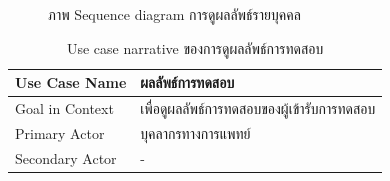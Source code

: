 \documentclass[12pt,oneside,openright,a4paper]{cpe-thai-project}
\begin{document}
\begin{itemize}
  \newpage
     \begin{figure}[!ht]\centering
      \setlength{\fboxrule}{0.2mm} %
      \setlength{\fboxsep}{1cm}
      \caption{ภาพ Sequence diagram การดูผลลัพธ์รายบุคคล}\label{fig:activity22}
     \end{figure}
     \newpage
     \begin{table}[!h]\centering
      \caption{Use case narrative ของการดูผลลัพธ์การทดสอบ}\label{tbl:application1}
      \begin{tabular}{|p{3cm}|p{12cm}|} \hline
      Use Case Name & ผลลัพธ์การทดสอบ \\ \hline
      Goal in Context & เพื่อดูผลลัพธ์การทดสอบของผู้เข้ารับการทดสอบ \\ \hline
      Primary Actor & บุคลากรทางการแพทย์\\ \hline
      Secondary Actor & - \\ \hline

\end{tabular}
\end{table}
\end{itemize}
\end{document}

